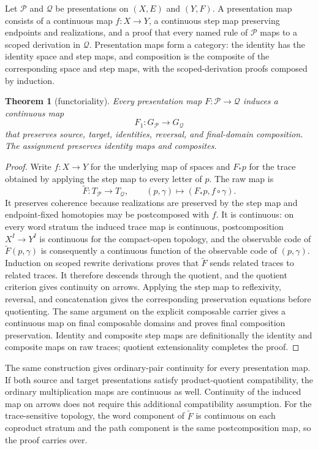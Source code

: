 \documentclass[10pt,reqno]{amsart}
\theoremstyle{definition}
\theoremstyle{plain}
\newtheorem{theorem}[definition]{Theorem}
\theoremstyle{remark}
\begin{document}
Let $\mathcal P$ and $\mathcal Q$ be presentations on $(X,E)$ and $(Y,F)$.
A presentation map consists of a continuous map $f:X\to Y$, a continuous
step map preserving endpoints and realizations, and a proof that every named
rule of $\mathcal P$ maps to a scoped derivation in $\mathcal Q$.
Presentation maps form a category: the identity has the identity space and step
maps, and composition is the composite of the corresponding space and step
maps, with the scoped-derivation proofs composed by induction.

\begin{theorem}[functoriality]
Every presentation map $F:\mathcal P\to\mathcal Q$ induces a continuous map
\[
  F_1:G_{\mathcal P}\longrightarrow G_{\mathcal Q}
\]
that preserves source, target, identities, reversal, and final-domain
composition.  The assignment preserves identity maps and composites.
\end{theorem}

\begin{proof}
Write $f:X\to Y$ for the underlying map of spaces and $F_*p$ for the trace
obtained by applying the step map to every letter of $p$.  The raw map is
\[
  \widetilde F:T_{\mathcal P}\longrightarrow T_{\mathcal Q},
  \qquad (p,\gamma)\longmapsto(F_*p,f\circ\gamma).
\]
It preserves coherence because realizations are preserved by the step map and
endpoint-fixed homotopies may be postcomposed with $f$.  It is continuous:
on every word stratum the induced trace map is continuous, postcomposition
$X^I\to Y^I$ is continuous for the compact-open topology, and the observable
code of $\widetilde F(p,\gamma)$ is consequently a continuous function of the
observable code of $(p,\gamma)$.  Induction on scoped rewrite derivations
proves that $\widetilde F$ sends related traces to related traces.  It therefore
descends through the quotient, and the quotient criterion gives continuity on
arrows.  Applying the step map to reflexivity, reversal, and concatenation
gives the corresponding preservation equations before quotienting.
The same argument on the explicit composable carrier gives a continuous map on
final composable domains and proves final composition preservation.  Identity
and composite step maps are definitionally the identity and composite maps on
raw traces; quotient extensionality completes the proof.
\end{proof}

The same construction gives ordinary-pair continuity for every presentation
map.  If both source and target presentations satisfy product-quotient
compatibility, the ordinary multiplication maps are continuous as well.  Continuity of the induced map on arrows does not require this
additional compatibility assumption.  For the trace-sensitive topology, the
word component of $\widetilde F$ is continuous on each coproduct stratum and
the path component is the same postcomposition map, so the proof carries
over.
\end{document}
